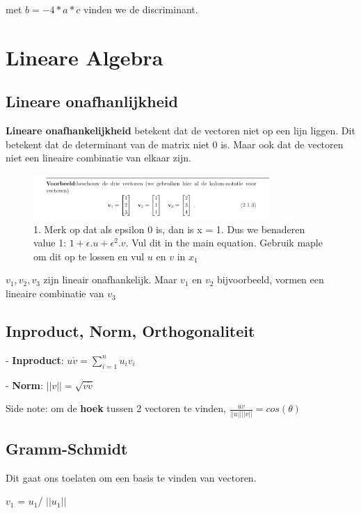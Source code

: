 \documentclass[a4paper]{article}
\begin{document}
met $b = -4*a*c$ vinden we de discriminant.

\section{Lineare Algebra}

\subsection{Lineare onafhanlijkheid}

\textbf{Lineare onafhankelijkheid} betekent dat de vectoren niet op een lijn liggen. Dit betekent dat de determinant van de matrix niet 0 is.
Maar ook dat de vectoren niet een lineaire combinatie van elkaar zijn.

\begin{figure}[htbp!]
	\centering
	\includegraphics[width=0.8\textwidth]{images/ex_lin_on.png}
	\caption{1. Merk op dat als epsilon 0 is, dan is x = 1. Dus we benaderen value 1: $1 + \epsilon . u + \epsilon^2 . v$. Vul dit in the main equation. Gebruik maple om dit op te lossen en vul $u$ en $v$ in $x_1$}
\end{figure}

$v_1, v_2, v_3$ zijn lineair onafhankelijk. Maar $v_1$ en $v_2$ bijvoorbeeld, vormen een lineaire combinatie van $v_3$

\subsection{Inproduct, Norm, Orthogonaliteit}

- \textbf{Inproduct}: $u \dot v = \sum_{i=1}^{n} u_i v_i$

- \textbf{Norm}: $||v|| = \sqrt{v \dot v}$

Side note: om de \textbf{hoek} tussen 2 vectoren te vinden, $\frac{u\dot v}{||u|| ||v||} = cos(\theta)$

\subsection{Gramm-Schmidt}

Dit gaat ons toelaten om een basis te vinden van vectoren.

$v_1$ = $u_1$/ $||u_1||$
\end{document}
